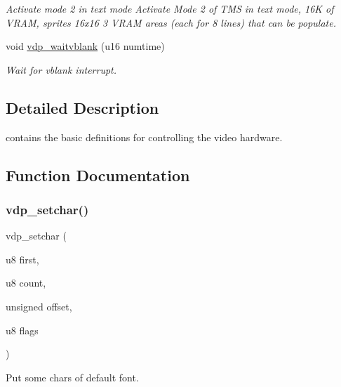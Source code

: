 \begin{DoxyCompactItemize}
\begin{DoxyCompactList}\small\item\em Activate mode 2 in text mode Activate Mode 2 of T\+MS in text mode, 16K of V\+R\+AM, sprites 16x16 3 V\+R\+AM areas (each for 8 lines) that can be populate. \end{DoxyCompactList}\item 
void \hyperlink{a00056_a83dfd82e385330c883c67c30137f9857}{vdp\+\_\+waitvblank} (u16 numtime)
\begin{DoxyCompactList}\small\item\em Wait for vblank interrupt. \end{DoxyCompactList}\end{DoxyCompactItemize}


\subsection{Detailed Description}
contains the basic definitions for controlling the video hardware. 



\subsection{Function Documentation}
\mbox{\label{a00056_ac70a5cddd82471f4d7ca9b84d8a58760}} 
\subsubsection{\texorpdfstring{vdp\+\_\+setchar()}{vdp\_setchar()}}
{\footnotesize\ttfamily vdp\+\_\+setchar (\begin{DoxyParamCaption}\item[{u8}]{first,  }\item[{u8}]{count,  }\item[{unsigned}]{offset,  }\item[{u8}]{flags }\end{DoxyParamCaption})}



Put some chars of default font. 


